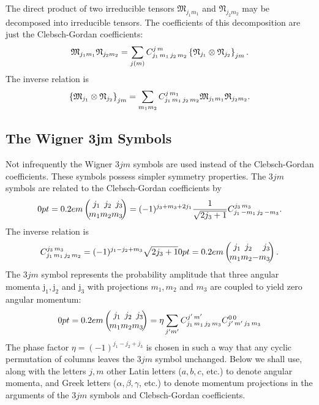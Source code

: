 The direct product of two irreducible tensors $\mathfrak{M}_{j_{1} m_{1}}$ and $\mathfrak{N}_{j_{2} m_{2}}$ may be decomposed into irreducible tensors. The coefficients of this decomposition are just the Clebsch-Gordan coefficients:
\begin{equation}
\mathfrak{M}_{j_{1} m_{1}} \mathfrak{N}_{j_{2} m_{2}}=\sum_{j(m)} C_{j_{1}\,m_{1}\,j_{2}\,m_{2}}^{j\,m}\left\{\mathfrak{N}_{j_{1}} \otimes \mathfrak{N}_{j_{2}}\right\}_{j m} . \label{eq:8:1:9}
\end{equation}
The inverse relation is
\begin{equation}
\left\{\mathfrak{M}_{j_{1}} \otimes \mathfrak{N}_{j_{2}}\right\}_{j m}=\sum_{m_{1} m_{2}} C_{j_{1}\,m_{1}\,j_{2}\,m_{2}}^{j\,m_{1}} \mathfrak{M}_{j_{1} m_{1}} \mathfrak{R}_{j_{2} m_{2}} . \label{eq:8:1:10}
\end{equation}
\subsection{The Wigner 3jm Symbols}\label{sec:8.1.2}
Not infrequently the Wigner $3 j m$ symbols \cite{ref110} are used instead of the Clebsch-Gordan coefficients. These symbols possess simpler symmetry properties. The $3 j m$ symbols are related to the Clebsch-Gordan coefficients by
\begin{equation}
\threej{j_{1}}{j_{2}}{j_{3}}{m_{1}}{m_{2}}{m_{3}}\label{eq:8:1:11}=(-1)^{j_{3}+m_{3}+2 j_{1}} \frac{1}{\sqrt{2 j_{3}+1}} \clebsch{j_{1}}{-m_{1}}{j_{2}}{-m_{3}}{j_{3}}{m_{3}} .
\end{equation}
The inverse relation is
\begin{equation}
\clebsch{j_{1}}{m_{1}}{j_{2}}{m_{2}}{j_{3}}{m_{3}}=(-1)^{j_{1}-j_{2}+m_{3}} \sqrt{2 j_{3}+1}\threej{j_{1}}{j_{2}}{j_{3}}{m_{1}}{m_{2}}{-m_{3}}\label{eq:8:1:12} .
\end{equation}
The $3 j m$ symbol represents the probability amplitude that three angular momenta $\mathrm{j}_{1}, \mathrm{j}_{2}$ and $\mathrm{j}_{3}$ with projections $m_{1}, m_{2}$ and $m_{3}$ are coupled to yield zero angular momentum:
\begin{equation}
\threej{j_{1}}{j_{2}}{j_{3}}{m_{1}}{m_{2}}{m_{3}}\label{eq:8:1:13}=\eta \sum_{j^{\prime} m^{\prime}} \clebsch{j_{1}}{m_{1}}{j_{2}}{m_{3}}{j^{\prime}}{m^{\prime}} \clebsch{j^{\prime}}{m^{\prime}}{j_{3}}{m_{3}}{0}{0}
\end{equation}
The phase factor $\eta=(-1)^{j_{1}-j_{2}+j_{3}}$ is chosen in such a way that any cyclic permutation of columns leaves the $3 j m$ symbol unchanged. Below we shall use, along with the letters $j, m$ other Latin letters ($a, b, c$, etc.) to denote angular momenta, and Greek letters ($\alpha, \beta, \gamma$, etc.) to denote momentum projections in the arguments of the $3 j m$ symbols and Clebsch-Gordan coefficients.

